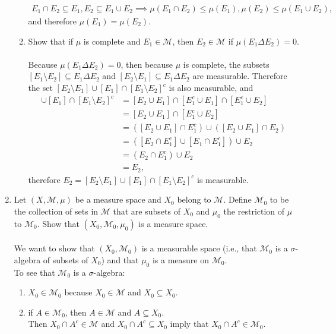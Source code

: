 \begin{enumerate}
\begin{enumerate}[label=(\roman*),align=left]
\begin{align*}
			E_1\cap E_2\subseteq E_1,E_2\subseteq E_1\cup E_2\implies\mu(E_1\cap E_2)\le\mu(E_1),\mu(E_2)\le\mu(E_1\cup E_2),
		\end{align*}
		and therefore $\mu(E_1)=\mu(E_2)$.
		\item Show that if $\mu$ is complete and $E_1\in\mathcal{M}$, then $E_2\in\mathcal{M}$ if $\mu(E_1\Delta E_2)=0$.\\
		\\Because $\mu(E_1\Delta E_2)=0$, then because $\mu$ is complete, the subsets $[E_1\setminus E_2]\subseteq E_1\Delta E_2$ and $[E_2\setminus E_1]\subseteq E_1\Delta E_2$ are measurable.
		Therefore the set $[E_2\setminus E_1]\cup[E_1]\cap[E_1\setminus E_2]^c$ is also measurable, and
		\begin{align*}
			[E_2\setminus E_1]\cup[E_1]\cap[E_1\setminus E_2]^c&=[E_2\cup E_1]\cap[E_1^c\cup E_1]\cap[E_1^c\cup E_2]\\
			&=[E_2\cup E_1]\cap[E_1^c\cup E_2]\\
			&=([E_2\cup E_1]\cap E_1^c)\cup ([E_2\cup E_1]\cap E_2)\\
			&=([E_2\cap E_1^c]\cup [E_1\cap E_1^c])\cup E_2\\
			&=(E_2\cap E_1^c)\cup E_2\\
			&=E_2,
		\end{align*}
		therefore $E_2=[E_2\setminus E_1]\cup[E_1]\cap[E_1\setminus E_2]^c$ is measurable.
	\end{enumerate}
	\item Let $(X,\mathcal{M},\mu)$ be a measure space and $X_0$ belong to $\mathcal{M}$.
	Define $\mathcal{M}_0$ to be the collection of sets in $\mathcal{M}$ that are subsets of $X_0$ and $\mu_0$ the restriction of $\mu$ to $\mathcal{M}_0$.
	Show that $(X_0,\mathcal{M}_0,\mu_0)$ is a measure space.\\
	\\We want to show that $(X_0,\mathcal{M}_0)$ is a measurable space (i.e., that $\mathcal{M}_0$ is a $\sigma$-algebra of subsets of $X_0$) and that $\mu_0$ is a measure on $\mathcal{M}_0$.
	\\To see that $\mathcal{M}_0$ is a $\sigma$-algebra:
	\begin{enumerate}[label=(\roman*),align=left]   
		\item $X_0\in\mathcal{M}_0$ because $X_0\in\mathcal{M}$ and $X_0\subseteq X_0$.
		\item if $A\in\mathcal{M}_0$, then $A\in\mathcal{M}$ and $A\subseteq X_0$.\\
		Then $X_0\cap A^c\in\mathcal{M}$ and $X_0\cap A^c\subseteq X_0$ imply that $X_0\cap A^c\in\mathcal{M}_0$.

\end{enumerate}
\end{enumerate}
